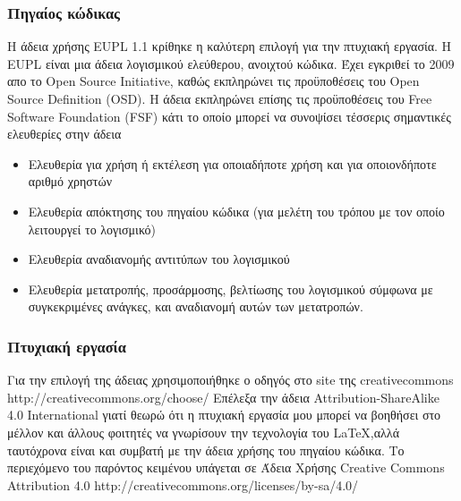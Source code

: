 \subsubsection{Πηγαίος κώδικας}
Η άδεια χρήσης EUPL 1.1 κρίθηκε η καλύτερη επιλογή για την πτυχιακή εργασία. Η EUPL είναι μια άδεια λογισμικού ελεύθερου, ανοιχτού κώδικα. Έχει εγκριθεί το 2009 απο το Open Source Initiative, καθώς εκπληρώνει τις προϋποθέσεις  του Open Source Definition (OSD)\cite{osi-definition}. Η άδεια εκπληρώνει επίσης τις προϋποθέσεις του Free Software Foundation (FSF) κάτι το οποίο μπορεί να συνοψίσει τέσσερις σημαντικές ελευθερίες στην άδεια
\begin{itemize}
\item Ελευθερία για χρήση ή εκτέλεση για οποιαδήποτε χρήση και για οποιονδήποτε αριθμό χρηστών
\item Ελευθερία απόκτησης του πηγαίου κώδικα (για μελέτη του τρόπου με τον οποίο λειτουργεί το λογισμικό)
\item Ελευθερία αναδιανομής αντιτύπων του λογισμικού
\item Ελευθερία μετατροπής, προσάρμοσης, βελτίωσης του λογισμικού σύμφωνα με συγκεκριμένες ανάγκες, και αναδιανομή αυτών των μετατροπών.
\end{itemize}

\subsubsection{Πτυχιακή εργασία}
Για την επιλογή της άδειας χρησιμοποιήθηκε ο οδηγός στο site της creativecommons http://creativecommons.org/choose/
Επέλεξα την άδεια Attribution-ShareAlike 4.0 International \ccbysa γιατί θεωρώ ότι η πτυχιακή εργασία μου μπορεί να βοηθήσει στο μέλλον και άλλους φοιτητές να γνωρίσουν την τεχνολογία του \LaTeX ,αλλά ταυτόχρονα είναι και συμβατή με την άδεια χρήσης του πηγαίου κώδικα.
\vfill
Το περιεχόμενο του παρόντος κειμένου υπάγεται σε Άδεια Χρήσης Creative Commons Attribution 4.0 http://creativecommons.org/licenses/by-sa/4.0/